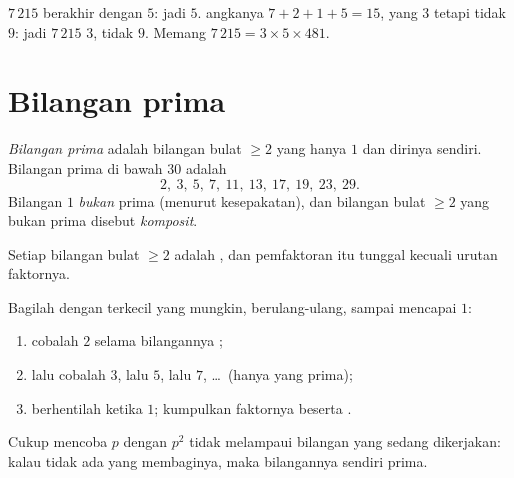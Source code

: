 \begin{example}
$7\,215$ berakhir dengan $5$: jadi  $5$.  angkanya
$7 + 2 + 1 + 5 = 15$, yang  $3$ tetapi tidak 
$9$: jadi $7\,215$  $3$, tidak  $9$. Memang
$7\,215 = 3 \times 5 \times 481$.
\end{example}

\section{Bilangan prima}

\begin{definition}\label{def:g9:arith:prime}
\emph{Bilangan prima} adalah bilangan bulat
$\geq 2$ yang  hanya $1$ dan dirinya sendiri. Bilangan prima
di bawah $30$ adalah
\[
2,\ 3,\ 5,\ 7,\ 11,\ 13,\ 17,\ 19,\ 23,\ 29 .
\]
Bilangan $1$ \emph{bukan} prima (menurut kesepakatan), dan bilangan
bulat $\geq 2$ yang bukan prima disebut \emph{komposit}.
\end{definition}

\begin{theorem}\label{thm:g9:arith:factorization}
Setiap bilangan bulat $\geq 2$ adalah  , dan
pemfaktoran itu tunggal kecuali urutan faktornya.
\end{theorem}
\admitted

\begin{method}\label{met:g9:arith:factorization}
Bagilah dengan  terkecil yang mungkin, berulang-ulang,
sampai mencapai $1$:
\begin{enumerate}
  \item cobalah $2$ selama bilangannya ;
  \item lalu cobalah $3$, lalu $5$, lalu $7$, \dots\ (hanya yang prima);
  \item berhentilah ketika  $1$; kumpulkan faktornya
        beserta .
\end{enumerate}
Cukup mencoba  $p$ dengan $p^2$ tidak melampaui bilangan
yang sedang dikerjakan: kalau tidak ada yang membaginya, maka
bilangannya sendiri prima.
\end{method}

